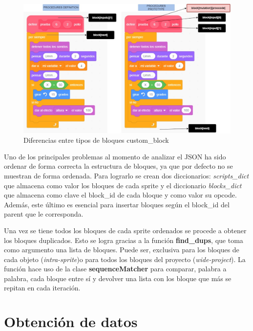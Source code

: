 \documentclass[a4paper, 12pt]{book}
\begin{document}
\begin{figure}[!htb]
  \centering
  \includegraphics[width=14cm, keepaspectratio]{img/scratch_custom.jpg}
  \caption{Diferencias entre tipos de bloques custom\_block}
  \label{fig:differences}
\end{figure}

\newpage 
Uno de los principales problemas al momento de analizar el JSON ha sido ordenar de forma correcta la estructura de bloques, ya que por defecto no se muestran de forma ordenada. Para lograrlo se crean dos diccionarios: \textit{scripts\_dict} que almacena como valor los bloques de cada sprite y el diccionario \textit{blocks\_dict} que almacena como clave el block\_id de cada bloque y como valor su opcode. Además, este último es esencial para insertar bloques según el block\_id del parent que le corresponda.

Una vez se tiene todos los bloques de cada sprite ordenados se procede a obtener los bloques duplicados. Esto se logra gracias a la función \textbf{find\_dups}, que toma como argumento una lista de bloques. Puede ser, exclusiva para los bloques de cada objeto (\textit{intra-sprite})o para todos los bloques del proyecto (\textit{wide-project}). La función hace uso de la clase \textbf{sequenceMatcher} para comparar, palabra a palabra, cada bloque entre sí y devolver una lista con los bloque que más se repitan en cada iteración. 


\section{Obtención de datos} 
\label{sec:obtenciondatos}
\end{document}
